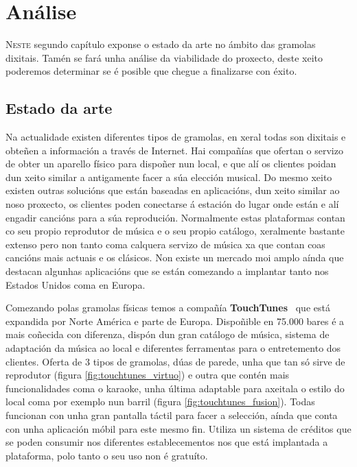 \chapter{Análise}
\label{chap:analise}

\lettrine{N}{este} segundo capítulo exponse o estado da arte no ámbito das gramolas dixitais. Tamén se fará unha análise da viabilidade do proxecto, deste xeito poderemos determinar se é posible que chegue a finalizarse con éxito.

\section{Estado da arte}
\label{sec:estado_da_arte}
Na actualidade existen diferentes tipos de gramolas, en xeral todas son dixitais e obteñen a información a través de Internet. Hai compañías que ofertan o servizo de obter un aparello físico para dispoñer nun local, e que alí os clientes poidan dun xeito similar a antigamente facer a súa elección musical. Do mesmo xeito existen outras solucións que están baseadas en aplicacións, dun xeito similar ao noso proxecto, os clientes poden conectarse á estación do lugar onde están e alí engadir cancións para a súa reprodución. Normalmente estas plataformas contan co seu propio reprodutor de música e o seu propio catálogo, xeralmente bastante extenso pero non tanto coma calquera servizo de música xa que contan coas cancións mais actuais e os clásicos. Non existe un mercado moi amplo aínda que destacan algunhas aplicacións que se están comezando a implantar tanto nos Estados Unidos coma en Europa.\bigskip

Comezando polas gramolas físicas temos a compañía \textbf{TouchTunes}~\cite{touchTunes} que está expandida por Norte América e parte de Europa. Dispoñible en 75.000 bares é a mais coñecida con diferenza, dispón dun gran catálogo de música, sistema de adaptación da música ao local e diferentes ferramentas para o entretemento dos clientes. Oferta de 3 tipos de gramolas, dúas de parede, unha que tan só sirve de reprodutor (figura \ref{fig:touchtunes_virtuo}) e outra que contén mais funcionalidades coma o karaoke, unha última adaptable para axeitala o estilo do local coma por exemplo nun barril (figura \ref{fig:touchtunes_fusion}). Todas funcionan con unha gran pantalla táctil para facer a selección, aínda que conta con unha aplicación móbil para este mesmo fin. Utiliza un sistema de créditos que se poden consumir nos diferentes establecementos nos que está implantada a plataforma, polo tanto o seu uso non é gratuíto.

